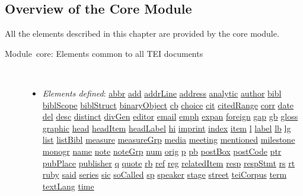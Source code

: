 \subsection[{Overview of the Core Module }]{Overview of the Core Module }\label{COOV}\par
All the elements described in this chapter are provided by the \textsf{core} module. \begin{description}

\item[{Module core: Elements common to all TEI documents}]\hspace{1em}\hfill\linebreak
\mbox{}\\[-10pt] \begin{itemize}
\item {\itshape Elements defined}: \hyperref[TEI.abbr]{abbr} \hyperref[TEI.add]{add} \hyperref[TEI.addrLine]{addrLine} \hyperref[TEI.address]{address} \hyperref[TEI.analytic]{analytic} \hyperref[TEI.author]{author} \hyperref[TEI.bibl]{bibl} \hyperref[TEI.biblScope]{biblScope} \hyperref[TEI.biblStruct]{biblStruct} \hyperref[TEI.binaryObject]{binaryObject} \hyperref[TEI.cb]{cb} \hyperref[TEI.choice]{choice} \hyperref[TEI.cit]{cit} \hyperref[TEI.citedRange]{citedRange} \hyperref[TEI.corr]{corr} \hyperref[TEI.date]{date} \hyperref[TEI.del]{del} \hyperref[TEI.desc]{desc} \hyperref[TEI.distinct]{distinct} \hyperref[TEI.divGen]{divGen} \hyperref[TEI.editor]{editor} \hyperref[TEI.email]{email} \hyperref[TEI.emph]{emph} \hyperref[TEI.expan]{expan} \hyperref[TEI.foreign]{foreign} \hyperref[TEI.gap]{gap} \hyperref[TEI.gb]{gb} \hyperref[TEI.gloss]{gloss} \hyperref[TEI.graphic]{graphic} \hyperref[TEI.head]{head} \hyperref[TEI.headItem]{headItem} \hyperref[TEI.headLabel]{headLabel} \hyperref[TEI.hi]{hi} \hyperref[TEI.imprint]{imprint} \hyperref[TEI.index]{index} \hyperref[TEI.item]{item} \hyperref[TEI.l]{l} \hyperref[TEI.label]{label} \hyperref[TEI.lb]{lb} \hyperref[TEI.lg]{lg} \hyperref[TEI.list]{list} \hyperref[TEI.listBibl]{listBibl} \hyperref[TEI.measure]{measure} \hyperref[TEI.measureGrp]{measureGrp} \hyperref[TEI.media]{media} \hyperref[TEI.meeting]{meeting} \hyperref[TEI.mentioned]{mentioned} \hyperref[TEI.milestone]{milestone} \hyperref[TEI.monogr]{monogr} \hyperref[TEI.name]{name} \hyperref[TEI.note]{note} \hyperref[TEI.noteGrp]{noteGrp} \hyperref[TEI.num]{num} \hyperref[TEI.orig]{orig} \hyperref[TEI.p]{p} \hyperref[TEI.pb]{pb} \hyperref[TEI.postBox]{postBox} \hyperref[TEI.postCode]{postCode} \hyperref[TEI.ptr]{ptr} \hyperref[TEI.pubPlace]{pubPlace} \hyperref[TEI.publisher]{publisher} \hyperref[TEI.q]{q} \hyperref[TEI.quote]{quote} \hyperref[TEI.rb]{rb} \hyperref[TEI.ref]{ref} \hyperref[TEI.reg]{reg} \hyperref[TEI.relatedItem]{relatedItem} \hyperref[TEI.resp]{resp} \hyperref[TEI.respStmt]{respStmt} \hyperref[TEI.rs]{rs} \hyperref[TEI.rt]{rt} \hyperref[TEI.ruby]{ruby} \hyperref[TEI.said]{said} \hyperref[TEI.series]{series} \hyperref[TEI.sic]{sic} \hyperref[TEI.soCalled]{soCalled} \hyperref[TEI.sp]{sp} \hyperref[TEI.speaker]{speaker} \hyperref[TEI.stage]{stage} \hyperref[TEI.street]{street} \hyperref[TEI.teiCorpus]{teiCorpus} \hyperref[TEI.term]{term} \hyperref[TEI.textLang]{textLang} \hyperref[TEI.time]{time} 
\end{itemize}
\end{description}
